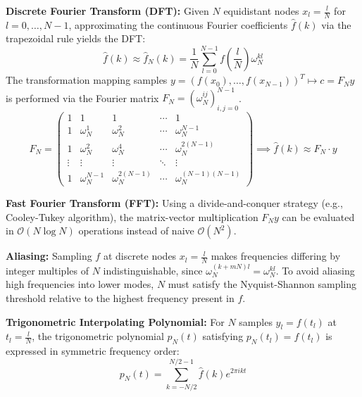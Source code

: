 \begin{definition}
    \textbf{Discrete Fourier Transform (DFT):} Given $N$ equidistant nodes $x_l = \frac{l}{N}$ for $l = 0, \dots, N-1$, approximating the continuous Fourier coefficients $\hat{f}(k)$ via the trapezoidal rule yields the DFT:
    $$\hat{f}(k) \approx \hat{f}_N(k) = \frac{1}{N} \sum_{l=0}^{N-1} f\left(\frac{l}{N}\right) \omega_N^{kl}$$
    The transformation mapping samples $y = (f(x_0), \dots, f(x_{N-1}))^T \mapsto c = F_N y$ is performed via the Fourier matrix $F_N = (\omega_N^{ij})_{i,j=0}^{N-1}$.
    $$F_N = \begin{pmatrix}
        1 & 1 & 1 & \cdots & 1 \\
        1 & \omega_N^1 & \omega_N^2 & \cdots & \omega_N^{N-1} \\
        1 & \omega_N^2 & \omega_N^4 & \cdots & \omega_N^{2(N-1)} \\
        \vdots & \vdots & \vdots & \ddots & \vdots \\
        1 & \omega_N^{N-1} & \omega_N^{2(N-1)} & \cdots & \omega_N^{(N-1)(N-1)}
    \end{pmatrix} \implies \hat{f}(k) \approx F_N \cdot y$$
\end{definition}

\begin{remark}
    \textbf{Fast Fourier Transform (FFT):} Using a divide-and-conquer strategy (e.g., Cooley-Tukey algorithm), the matrix-vector multiplication $F_N y$ can be evaluated in $\mathcal{O}(N \log N)$ operations instead of naive $\mathcal{O}(N^2)$.
\end{remark}

\begin{remark}
    \textbf{Aliasing:} Sampling $f$ at discrete nodes $x_l = \frac{l}{N}$ makes frequencies differing by integer multiples of $N$ indistinguishable, since $\omega_N^{(k + mN)l} = \omega_N^{kl}$. To avoid aliasing high frequencies into lower modes, $N$ must satisfy the Nyquist-Shannon sampling threshold relative to the highest frequency present in $f$.
\end{remark}

\begin{definition}
    \textbf{Trigonometric Interpolating Polynomial:} For $N$ samples $y_l = f(t_l)$ at $t_l = \frac{l}{N}$, the trigonometric polynomial $p_N(t)$ satisfying $p_N(t_l) = f(t_l)$ is expressed in symmetric frequency order:
    $$p_N(t) = \sum_{k=-N/2}^{N/2-1} \hat{f}(k) e^{2\pi i k t}$$
\end{definition}


